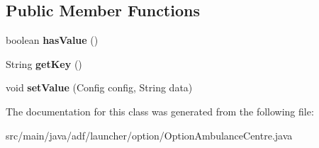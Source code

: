 \subsection*{Public Member Functions}
\begin{DoxyCompactItemize}
\item 
\hypertarget{classadf_1_1launcher_1_1option_1_1OptionAmbulanceCentre_abdb5497c0cfa21a659e330a98a6124c0}{}\label{classadf_1_1launcher_1_1option_1_1OptionAmbulanceCentre_abdb5497c0cfa21a659e330a98a6124c0} 
boolean {\bfseries has\+Value} ()
\item 
\hypertarget{classadf_1_1launcher_1_1option_1_1OptionAmbulanceCentre_a5cc9104fd5f4f6f1a015fa7fd4f70774}{}\label{classadf_1_1launcher_1_1option_1_1OptionAmbulanceCentre_a5cc9104fd5f4f6f1a015fa7fd4f70774} 
String {\bfseries get\+Key} ()
\item 
\hypertarget{classadf_1_1launcher_1_1option_1_1OptionAmbulanceCentre_ab9d2a7e48b93c90426b20ef29d464b78}{}\label{classadf_1_1launcher_1_1option_1_1OptionAmbulanceCentre_ab9d2a7e48b93c90426b20ef29d464b78} 
void {\bfseries set\+Value} (Config config, String data)
\end{DoxyCompactItemize}


The documentation for this class was generated from the following file\+:\begin{DoxyCompactItemize}
\item 
src/main/java/adf/launcher/option/Option\+Ambulance\+Centre.\+java\end{DoxyCompactItemize}
